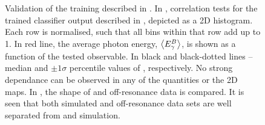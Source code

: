 \begin{figure}[htbp!]
    \centering
    \caption{\label{fig:bdt_validation} 
    Validation of the training described in .
    In , correlation tests for the trained classifier output described in , depicted as a 2D histogram.
    Each row is normalised, such that all bins within that row add up to 1.
    In red line, the average photon energy, $\expval{{\ensuremath{E^B_{\gamma}}}}$, is shown as a function of the tested observable.
    In black and black-dotted lines -- median and $\pm 1 \sigma$ percentile values of \EB, respectively.
    No strong dependance can be observed in any of the quantities or the 2D maps.
    In , the shape of \epem\ra\qqbar and off-resonance data is compared.
    It is seen that both simulated and off-resonance data sets are well separated from \BB and \BtoXsgamma simulation.
    }
\end{figure}